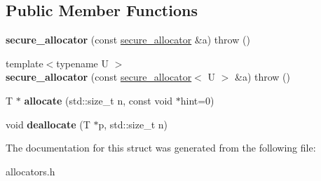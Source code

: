 \subsection*{Public Member Functions}
\begin{DoxyCompactItemize}
\item 
\mbox{\label{structsecure__allocator_ae5bfb3589a310e55894bae988d566c44}} 
{\bfseries secure\+\_\+allocator} (const \mbox{\hyperlink{structsecure__allocator}{secure\+\_\+allocator}} \&a)  throw ()
\item 
\mbox{\label{structsecure__allocator_ad7605317012ed2eed2eecb955345d140}} 
{\footnotesize template$<$typename U $>$ }\\{\bfseries secure\+\_\+allocator} (const \mbox{\hyperlink{structsecure__allocator}{secure\+\_\+allocator}}$<$ U $>$ \&a)  throw ()
\item 
\mbox{\label{structsecure__allocator_aee6c375ead3ab5b477898787308bd2d9}} 
T $\ast$ {\bfseries allocate} (std\+::size\+\_\+t n, const void $\ast$hint=0)
\item 
\mbox{\label{structsecure__allocator_af86cc49185bd507b8b479e070d744eb0}} 
void {\bfseries deallocate} (T $\ast$p, std\+::size\+\_\+t n)
\end{DoxyCompactItemize}


The documentation for this struct was generated from the following file\+:\begin{DoxyCompactItemize}
\item 
allocators.\+h\end{DoxyCompactItemize}
